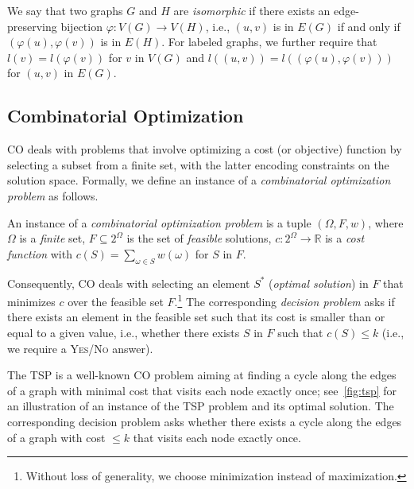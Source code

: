 \documentclass[twoside,11pt]{article}
\newcommand{\new}[1]{\emph{#1}}
\newcommand{\bbR}{\ensuremath{\mathbb{R}}}
\begin{document}
We say that two graphs $G$ and $H$
are \new{isomorphic} if there exists an edge-preserving bijection
$\varphi \colon V(G) \to V(H)$, i.e., $(u,v)$ is in $E(G)$ if and only if
$(\varphi(u),\varphi(v))$ is in $E(H)$. For labeled graphs, we further require that
$l(v) = l(\varphi(v))$ for $v$ in $V(G)$ and $l((u,v)) = l((\varphi(u), \varphi(v)))$ for $(u,v)$ in $E(G)$.



\subsection{Combinatorial Optimization}
CO deals with problems that involve optimizing a cost (or objective) function by selecting a subset from a finite set, with the latter encoding constraints on the solution space. Formally, we define an instance of a \new{combinatorial optimization problem} as follows.
\begin{definition}
	An instance of a \emph{combinatorial optimization problem} is a tuple $(\Omega, F, w)$, where $\Omega$ is a \emph{finite} set, $F \subseteq 2^\Omega$ is the set of \emph{feasible} solutions, $c \colon 2^\Omega \to \bbR$ is a \emph{cost function} with $c(S) = \sum_{\omega \in S} w(\omega)$ for $S$ in $F$. %
\end{definition}
Consequently, CO deals with selecting an element $S^*$ (\new{optimal solution}) in $F$ that minimizes $c$ over the feasible set $F$.\footnote{Without loss of generality, we choose minimization instead of maximization.} The corresponding \new{decision problem} asks if there exists an element in the feasible set such that its cost is smaller than or equal to a given value, i.e., whether there exists  $S$ in $F$ such that $c(S) \leq k$ (i.e., we require a \textsc{Yes}/\textsc{No} answer).

The TSP is a well-known CO problem aiming at finding a cycle along the edges of a graph with minimal cost that visits each node exactly once; see~\cref{fig:tsp} for an illustration of an instance of the TSP problem and its optimal solution. The corresponding decision problem asks whether there exists a cycle along the edges of a graph with cost $\leq k$ that visits each node exactly once.
\end{document}
